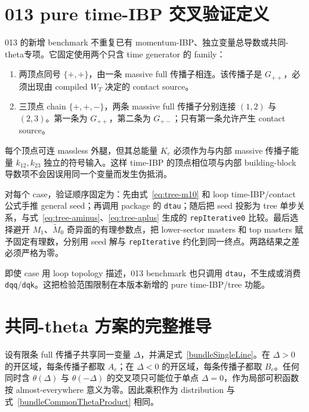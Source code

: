 ﻿\documentclass[a4paper,11pt]{article}
\begin{document}
\section{013 pure time-IBP 交叉验证定义}

013 的新增 benchmark 不重复已有 momentum-IBP、独立变量总导数或共同-theta专项。它固定使用两个只含 time generator 的 family：
\begin{enumerate}
  \item 两顶点同号 $\{+,+\}$，由一条 massive full 传播子相连。该传播子是 $G_{++}$，必须出现由 compiled $W_T$ 决定的 contact source。
  \item 三顶点 chain $\{+,+,-\}$，两条 massive full 传播子分别连接 $(1,2)$ 与 $(2,3)$。第一条为 $G_{++}$，第二条为 $G_{+-}$；只有第一条允许产生 contact source。
\end{enumerate}
每个顶点可连 massless 外腿，但其总能量 $K_e$ 必须作为与内部 massive 传播子能量 $k_{12},k_{23}$ 独立的符号输入。这样 time-IBP 的顶点相位项与内部 building-block 导数项不会因误用同一个变量而发生伪抵消。

对每个 case，验证顺序固定为：先由式~\eqref{eq:tree-m10} 和 loop time-IBP/contact 公式手推 general seed；再调用 package 的 \texttt{dtau}；随后把 seed 投影为 tree 单步关系，与式~\eqref{eq:tree-aminus}、\eqref{eq:tree-aplus} 生成的 \texttt{repIterative0} 比较。最后选择避开 $M_1$、$\widetilde M_0$ 奇异面的有理参数点，把 lower-sector masters 和 top masters 赋予固定有理数，分别用 seed 解与 \texttt{repIterative} 约化到同一终点。两路结果之差必须严格为零。

即使 case 用 loop topology 描述，013 benchmark 也只调用 \texttt{dtau}，不生成或消费 \texttt{dqq}/\texttt{dqk}。这把检验范围限制在本版本新增的 pure time-IBP/tree 功能。

\appendix

\section{共同-theta 方案的完整推导}
\label{app:commonThetaDerivation}

设有限条 full 传播子共享同一变量 $\Delta$，并满足式~\eqref{bundleSingleLine}。在 $\Delta>0$ 的开区域，每条传播子都取 $A_e$；在 $\Delta<0$ 的开区域，每条传播子都取 $B_e$。任何同时含 $\theta(\Delta)$ 与 $\theta(-\Delta)$ 的交叉项只可能位于单点 $\Delta=0$，作为局部可积函数按 almost-everywhere 意义为零。因此乘积作为 distribution 与式~\eqref{bundleCommonThetaProduct} 相同。
\end{document}
